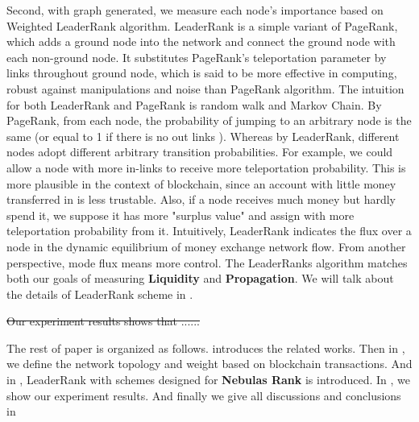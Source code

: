 Second, with graph generated, we measure each node's importance based on Weighted LeaderRank algorithm\cite{Chen2013}\cite{Li2014}. LeaderRank is a simple variant of PageRank, which adds a ground node into the network and connect the ground node with each non-ground node. It substitutes PageRank's teleportation parameter by links throughout ground node, which is said to be more effective in computing, robust against manipulations and noise than PageRank algorithm\cite{Chen2013}. The intuition for both LeaderRank and PageRank is random walk and Markov Chain. By PageRank, from each node, the probability of jumping to an arbitrary node is the same (or equal to 1 if there is no out links \cite{Kim2002}). Whereas by LeaderRank\cite{Li2014}\cite{Chen2013}, different nodes adopt different arbitrary transition probabilities. For example, we could allow a node with more in-links to receive more teleportation probability. This is more plausible in the context of blockchain, since an account with little money transferred in is less trustable. Also, if a node receives much money but hardly spend it, we suppose it has more "surplus value" and assign with more teleportation probability from it. Intuitively, LeaderRank indicates the flux over a node in the dynamic equilibrium of money exchange network flow. From another perspective, mode flux means more control. The LeaderRanks algorithm matches both our goals of measuring \textbf{Liquidity} and \textbf{Propagation}. We will talk about the details of LeaderRank scheme in .

\st{Our experiment results shows that ...... }

The rest of paper is organized as follows.  introduces the related works. Then in , we define the network topology and weight based on blockchain transactions. And in , LeaderRank with schemes designed for \textbf{Nebulas Rank} is introduced. In , we show our experiment results. And finally we give all discussions and conclusions in 

